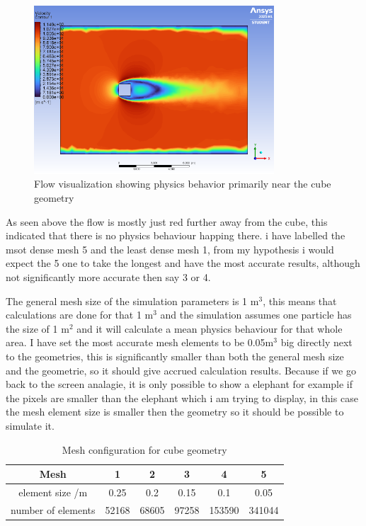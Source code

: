\documentclass[12pt,a4paper]{article}
\begin{document}
\begin{figure}[H]
    \centering
    \includegraphics[width=0.8\textwidth]{image1.png}
    \caption{Flow visualization showing physics behavior primarily near the cube geometry}
    \label{fig:flow_viz}
\end{figure}

As seen above the flow is mostly just red further away from the cube, this indicated that there is no physics behaviour happing there. i have labelled the msot dense mesh 5 and the least dense mesh 1, from my hypothesis i would expect the 5 one to take the longest and have the most accurate results, although not significantly more accurate then say 3 or 4. 

The general mesh size of the simulation parameters is 1 m$^3$, this means that calculations are done for that 1 m$^3$ and the simulation assumes one particle has the size of 1 m$^2$ and it will calculate a mean physics behaviour for that whole area. I have set the most accurate mesh elements to be 0.05m$^3$ big directly next to the geometries, this is significantly smaller than both the general mesh size and the geometrie, so it should give accrued calculation results. Because if we go back to the screen analagie, it is only possible to show a elephant for example if the pixels are smaller than the elephant which i am trying to display, in this case the mesh element size is smaller then the geometry so it should be possible to simulate it.

\begin{table}[H]
\centering
\caption{Mesh configuration for cube geometry}
\label{tab:mesh_config}
\begin{tabular}{|c|c|c|c|c|c|}
\hline
\rowcolor{red!50}
\textbf{Mesh} & \textbf{1} & \textbf{2} & \textbf{3} & \textbf{4} & \textbf{5} \\
\hline
element size /m & 0.25 & 0.2 & 0.15 & 0.1 & 0.05 \\
\hline
number of elements & 52168 & 68605 & 97258 & 153590 & 341044 \\
\hline
\end{tabular}
\end{table}
\end{document}
